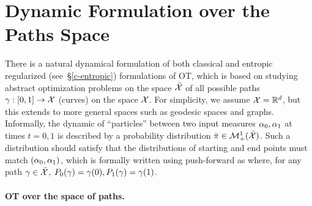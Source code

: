 


\section{Dynamic Formulation over the Paths Space}
\label{sec-entropic-dynamic}

There is a natural dynamical formulation of both classical and entropic regularized (see~\S\ref{c-entropic}) formulations of OT, which is based on studying abstract optimization problems on the space $\bar{\mathcal{X}}$ of all possible paths $\gamma : [0,1] \rightarrow \mathcal{X}$ (\ie curves) on the space $\mathcal{X}$. 
% 
For simplicity, we assume $\mathcal{X}=\mathbb{R}^d$, but this extends to more general spaces such as geodesic spaces and graphs.
%
Informally, the dynamic of ``particles'' between two input measures $\alpha_0,\alpha_1$ at times $t=0,1$ is described by a probability distribution $\bar\pi \in \mathcal{M}_+^1(\bar{\mathcal{X}})$. Such a distribution should satisfy that the distributions of starting and end points must match $(\alpha_0,\alpha_1)$, which is formally written using push-forward as
where, for any path $\gamma \in \bar{\mathcal{X}}$, $P_0(\gamma) = \gamma(0), P_1(\gamma) = \gamma(1)$.

\paragraph{OT over the space of paths.}

